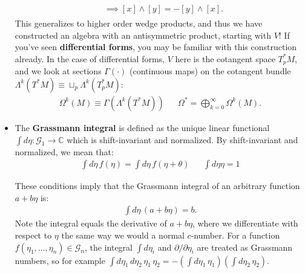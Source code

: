 \documentclass[12pt, oneside]{article}   	%
\theoremstyle{definition}
\begin{document}
\begin{itemize}
\begin{answerbox}
\begin{align}
\begin{split}
		&\implies [x]\wedge [y] = -[y]\wedge [x].
	\end{split}\end{align}
	This generalizes to higher order wedge products, and thus we have constructed an algebra with an antisymmetric product, starting with $V$! If you've seen \textbf{differential forms}, you may be familiar with this construction already. In the case of differential forms, $V$ here is the cotangent space $T_p^* M$, and we look at sections $\Gamma(\cdot)$ (continuous maps) on the cotangent bundle $\Lambda^k (T^* M)\equiv \sqcup_p \Lambda^k(T^*_p M)$:
	\begin{align}
		\Omega^k(M) \equiv \Gamma(\Lambda^k (T^* M)) && \Omega^* = \bigoplus_{k = 0}^\infty \Omega^k(M).
	\end{align}
	
	\end{answerbox}
	
	\item The \textbf{Grassmann integral} is defined as the unique linear functional $\int d\eta : \mathcal G_1\rightarrow\mathbb C$ which is 
	shift-invariant and normalized. By shift-invariant and normalized, we mean that:
	\begin{align}
		\int d\eta\, f(\eta) = \int d\eta\, f(\eta + \theta) && \int d\eta \eta = 1
	\end{align}
	
	These conditions imply that the Grassmann integral of an arbitrary function $a + b\eta$ is: 
	\begin{align}
		\int d\eta\, (a + b\eta) = b.
	\end{align}
	Note the integral equals the derivative of $a + b\eta$, where we differentiate with respect to $\eta$ the same way we 
	would a normal $c$-number. For a function $f(\eta_1, ..., \eta_n)\in\mathcal G_n$, the integral $\int d\eta_i$ and 
	$\partial / \partial \eta_i$ are treated as Grassmann numbers, so for example $\int d\eta_1\,d\eta_2\,\eta_1\,\eta_2 = 
	-(\int d\eta_1\, \eta_1)(\int d\eta_2\,\eta_2)$.
	

\end{itemize}
\end{document}

